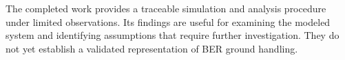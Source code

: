 The completed work provides a traceable simulation and analysis procedure under limited observations. Its findings are useful for examining the modeled system and identifying assumptions that require further investigation. They do not yet establish a validated representation of BER ground handling.
